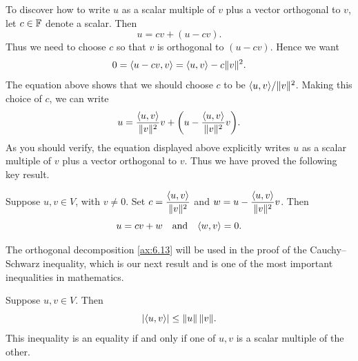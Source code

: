 To discover how to write $u$ as a scalar multiple of $v$ plus a vector
orthogonal to $v$, let $c\in\mathbb{F}$ denote a scalar. Then
\[ u = cv+(u-cv). \]
Thus we need to choose $c$ so that $v$ is orthogonal to $(u-cv)$. Hence we want
\[ 0 = \langle u-cv, v \rangle = \langle u, v \rangle-c\lVert v \rVert^2. \]
The equation above shows that we should choose $c$ to be
$\langle u, v \rangle/\lVert v \rVert^2$. Making this choice of $c$, we can write
\[ u = \frac{\langle u, v \rangle}{\lVert v \rVert^2}v
       +\biggl(u-\frac{\langle u, v \rangle}{\lVert v \rVert^2}v\biggr). \]
As you should verify, the equation displayed above explicitly writes $u$ as a
scalar multiple of $v$ plus a vector orthogonal to $v$. Thus we have proved the
following key result.

\begin{result}\label{ax:6.13}
Suppose $u,v\in V$, with $v\ne0$. Set
$c=\dfrac{\langle u, v \rangle}{\lVert v \rVert^2}$ and
$w=u-\dfrac{\langle u, v \rangle}{\lVert v \rVert^2}v$. Then
\[ u=cv+w \quad\text{and}\quad \langle w, v \rangle=0. \]
\end{result}

The orthogonal decomposition \ref{ax:6.13} will be used in the proof of the
Cauchy--Schwarz inequality, which is our next result and is one of the most
important inequalities in mathematics.

\begin{result}\label{ax:6.14}
Suppose $u,v\in V$. Then
\[ \lvert \langle u, v \rangle \rvert \le \lVert u \rVert\,\lVert v \rVert. \]
This inequality is an equality if and only if one of $u,v$ is a scalar multiple
of the other.
\end{result}

